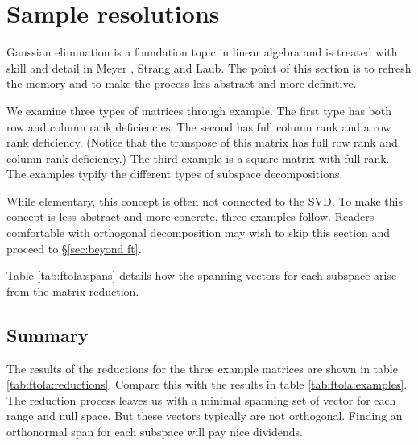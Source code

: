 \section{Sample resolutions}
Gaussian elimination is a foundation topic in linear algebra and is treated with skill and detail in Meyer \cite[\S 12]{Meyer2000}, Strang and Laub. The point of this section is to refresh the memory and to make the process less abstract and more definitive. 

We examine three types of matrices through example. The first type has both row and column rank deficiencies. The second has full column rank and a row rank deficiency. (Notice that the transpose of this matrix has full row rank and column rank deficiency.) The third example is a square matrix with full rank. The examples typify the different types of subspace decompositions.

While elementary, this concept is often not connected to the SVD. To make this concept is less abstract and more concrete, three examples follow. Readers comfortable with orthogonal decomposition may wish to skip this section and proceed to \S \eqref{sec:beyond ft}.

Table \eqref{tab:ftola:spans} details how the spanning vectors for each subspace arise from the matrix reduction. 



\subsection{Summary}
The results of the reductions for the three example matrices are shown in table \eqref{tab:ftola:reductions}. Compare this with the results in table \eqref{tab:ftola:examples}. The reduction process leaves us with a minimal spanning set of vector for each range and null space. But these vectors typically are not orthogonal. Finding an orthonormal span for each subspace will pay nice dividends.


\endinput
